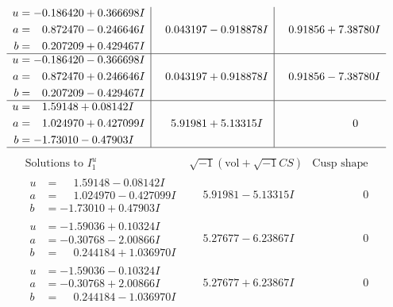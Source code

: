 \documentclass[1p]{elsarticle_modified}
\theoremstyle{definition}
\newcommand{\I}{\sqrt{-1}}
\begin{document}
$$\begin{array}{c|c|c}
\begin{aligned}
u &= -0.186420 + 0.366698 I \\
a &= \phantom{-}0.872470 - 0.246646 I \\
b &= \phantom{-}0.207209 + 0.429467 I\end{aligned}
 & \phantom{-}0.043197 - 0.918878 I & \phantom{-}0.91856 + 7.38780 I \\ \hline\begin{aligned}
u &= -0.186420 - 0.366698 I \\
a &= \phantom{-}0.872470 + 0.246646 I \\
b &= \phantom{-}0.207209 - 0.429467 I\end{aligned}
 & \phantom{-}0.043197 + 0.918878 I & \phantom{-}0.91856 - 7.38780 I \\ \hline\begin{aligned}
u &= \phantom{-}1.59148 + 0.08142 I \\
a &= \phantom{-}1.024970 + 0.427099 I \\
b &= -1.73010 - 0.47903 I\end{aligned}
 & \phantom{-}5.91981 + 5.13315 I & \phantom{-0.000000 } 0\\
 \hline 
 \end{array}$$\newpage$$\begin{array}{c|c|c}  
\text{Solutions to }I^u_{1}& \I (\text{vol} + \sqrt{-1}CS) & \text{Cusp shape}\\
 \hline 
\begin{aligned}
u &= \phantom{-}1.59148 - 0.08142 I \\
a &= \phantom{-}1.024970 - 0.427099 I \\
b &= -1.73010 + 0.47903 I\end{aligned}
 & \phantom{-}5.91981 - 5.13315 I & \phantom{-0.000000 } 0 \\ \hline\begin{aligned}
u &= -1.59036 + 0.10324 I \\
a &= -0.30768 - 2.00866 I \\
b &= \phantom{-}0.244184 + 1.036970 I\end{aligned}
 & \phantom{-}5.27677 - 6.23867 I & \phantom{-0.000000 } 0 \\ \hline\begin{aligned}
u &= -1.59036 - 0.10324 I \\
a &= -0.30768 + 2.00866 I \\
b &= \phantom{-}0.244184 - 1.036970 I\end{aligned}
 & \phantom{-}5.27677 + 6.23867 I & \phantom{-0.000000 } 0 \\ \hline\begin{aligned}

\end{aligned}
\end{array}$$
\end{document}

